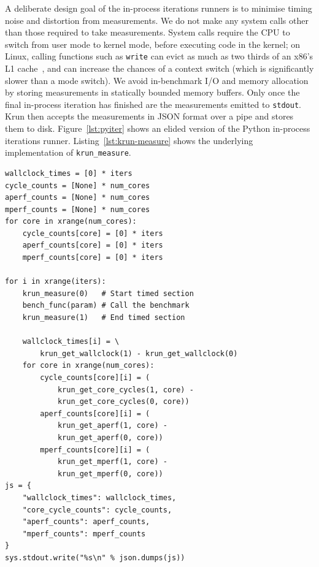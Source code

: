 \documentclass[preprint,numbers,10pt]{sigplanconf}
\newcommand{\krun}{Krun\xspace}
\begin{document}
A deliberate design goal of the in-process iterations runners is to minimise
timing noise and distortion from measurements. We do not make any system calls
other than those required to take measurements. System calls require the CPU to
switch from user mode to kernel mode, before executing code in the kernel; on
Linux, calling functions such as \texttt{write} can evict as much as two thirds
of an x86's L1 cache~\cite{soares10flexsc}, and can increase the chances of a
context switch (which is significantly slower than a mode switch). We avoid
in-benchmark I/O and memory allocation by storing measurements in statically
bounded memory buffers. Only once the final in-process iteration has finished
are the measurements emitted to \texttt{stdout}. \krun then accepts the
measurements in JSON format over a pipe and stores them to disk.
Figure~\ref{lst:pyiter} shows
an elided version of the Python in-process iterations runner.
Listing~\ref{lst:krun-measure} shows the underlying implementation of
\texttt{krun\_measure}.

\begin{lstlisting}[label=lst:pyiter, caption={The Python in-process iterations runner.}]
wallclock_times = [0] * iters
cycle_counts = [None] * num_cores
aperf_counts = [None] * num_cores
mperf_counts = [None] * num_cores
for core in xrange(num_cores):
    cycle_counts[core] = [0] * iters
    aperf_counts[core] = [0] * iters
    mperf_counts[core] = [0] * iters

for i in xrange(iters):
    krun_measure(0)   # Start timed section
    bench_func(param) # Call the benchmark
    krun_measure(1)   # End timed section

    wallclock_times[i] = \
        krun_get_wallclock(1) - krun_get_wallclock(0)
    for core in xrange(num_cores):
        cycle_counts[core][i] = (
            krun_get_core_cycles(1, core) -
            krun_get_core_cycles(0, core))
        aperf_counts[core][i] = (
            krun_get_aperf(1, core) -
            krun_get_aperf(0, core))
        mperf_counts[core][i] = (
            krun_get_mperf(1, core) -
            krun_get_mperf(0, core))
js = {
    "wallclock_times": wallclock_times,
    "core_cycle_counts": cycle_counts,
    "aperf_counts": aperf_counts,
    "mperf_counts": mperf_counts
}
sys.stdout.write("%s\n" % json.dumps(js))
\end{lstlisting}
\end{document}
